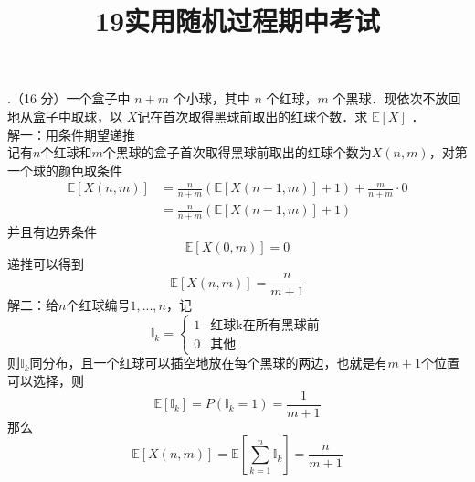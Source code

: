 \documentclass[UTF8]{ctexart}
\title{19实用随机过程期中考试}
\author{\calligra{NULIOUS}}
\date{}
\begin{document}
\maketitle
{}.（16 分）一个盒子中 $n+m$ 个小球，其中 $n$ 个红球，$m$ 个黑球．现依次不放回地从盒子中取球，以 $X$记在首次取得黑球前取出的红球个数．求 $\mathbb{E} [X]$ ．\\
解一：用条件期望递推\\
记有$n$个红球和$m$个黑球的盒子首次取得黑球前取出的红球个数为$X(n,m)$，对第一个球的颜色取条件\\
\begin{align*}
	\mathbb{E}[X(n,m)] & =\frac{n}{n+m}\left( \mathbb{E}[X(n-1,m)]+1 \right)+\frac{m}{n+m}\cdot 0 \\
	&=\frac{n}{n+m}\left( \mathbb{E}[X(n-1,m)]+1 \right)
\end{align*}
并且有边界条件
\[
\mathbb{E}[X(0,m)]=0
\]
递推可以得到
\[
\mathbb{E}[X(n,m)]=\frac{n}{m+1}
\]
解二：给$n$个红球编号$1,...,n$，记
\[
\mathbb{I}_k=
\begin{cases}
	1  &  \text{红球k在所有黑球前} \\
	0  &  \text{其他}
\end{cases}
\]
则$\mathbb{I}_k$同分布，且一个红球可以插空地放在每个黑球的两边，也就是有$m+1$个位置可以选择，则
\[
\mathbb{E}[\mathbb{I}_k]=P(\mathbb{I}_k=1)=\frac{1}{m+1}
\]
那么
\[
\mathbb{E}[X(n,m)]=\mathbb{E}\left[\sum_{k=1}^n  \mathbb{I}_k \right]=\frac{n}{m+1} 
\]\\
\end{document}
